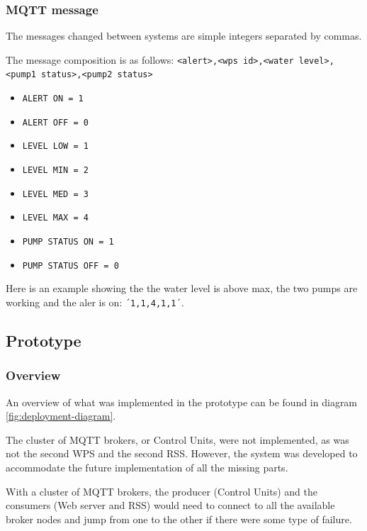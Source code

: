 \documentclass[11pt]{article}
\begin{document}
\subsubsection{MQTT message}

The messages changed between systems are simple integers separated by commas.

The message composition is as follows:
\newline
\newline
\texttt{<alert>,<wps id>,<water level>,<pump1 status>,<pump2 status>}
 
 \begin{itemize}
 \setlength\itemsep{0em}
 \item \texttt{ALERT ON = 1}
 \item \texttt{ALERT OFF = 0}
 \item \texttt{LEVEL LOW = 1}
 \item \texttt{LEVEL MIN = 2}
 \item \texttt{LEVEL MED = 3}
 \item \texttt{LEVEL MAX = 4}
 \item \texttt{PUMP STATUS ON = 1}
 \item \texttt{PUMP STATUS OFF = 0}
\end{itemize}
 
Here is an example showing the the water level is above max, the two pumps are working and the aler is on: \texttt{´1,1,4,1,1´}.

\subsection{Prototype}

\subsubsection{Overview}

An overview of what was implemented in the prototype can be found in diagram \ref{fig:deployment-diagram}.

The cluster of MQTT brokers, or Control Units, were not implemented, as was not the second WPS and the second RSS.
However, the system was developed to accommodate the future implementation of all the missing parts.

With a cluster of MQTT brokers, the producer (Control Units) and the consumers (Web server and RSS) would need to connect to all the available broker nodes and jump from one to the other if there were some type of failure.
\end{document}
